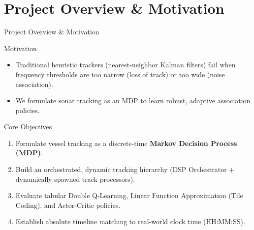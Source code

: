 \documentclass[10pt]{beamer}
\begin{document}
\section{Project Overview \& Motivation}

\begin{frame}{Project Overview \& Motivation}
    \begin{block}{Motivation}
        \begin{itemize}
            \item Traditional heuristic trackers (nearest-neighbor Kalman filters) fail when frequency thresholds are too narrow (loss of track) or too wide (noise association).
            \item We formulate sonar tracking as an MDP to learn robust, adaptive association policies.
        \end{itemize}
    \end{block}
    
    \begin{block}{Core Objectives}
        \begin{enumerate}
            \item Formulate vessel tracking as a discrete-time \textbf{Markov Decision Process (MDP)}.
            \item Build an orchestrated, dynamic tracking hierarchy (DSP Orchestrator + dynamically spawned track processors).
            \item Evaluate tabular Double Q-Learning, Linear Function Approximation (Tile Coding), and Actor-Critic policies.
            \item Establish absolute timeline matching to real-world clock time (HH:MM:SS).
        \end{enumerate}
    \end{block}
\end{frame}
\end{document}
